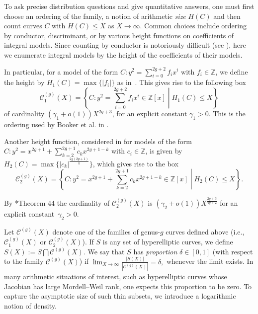 \documentclass{amsart}
\newcommand{\Z}{{\mathbb Z}}
\newcommand{\cC}{\mathcal{C}}
\begin{document}
 
 

 
 To ask precise distribution questions and give quantitative answers, one must first choose an ordering of the family, a notion of arithmetic \textit{size} $H(C)$ and then count curves $C$ with $H(C) \leq X$ as $X \to \infty $. Common choices include ordering by conductor, discriminant, or by various height functions on coefficients of integral models. Since counting by conductor is  notoriously difficult (see \cite{Brumer1992}), here we  enumerate integral models by the height of the coefficients of their models. 

 \medskip

 
In particular, for a model of the form $C: y^2=\sum_{i=0}^{2g+2}f_ix^i$ with $f_i \in \mathbb Z$, we define the height by $H_1(C) = \max\{|f_i|\}$ as in~\cite{BhargavaGross2017}.  This gives rise to the following box
 \begin{equation}\label{eq:cC1}
 \cC_1^{(g)}(X)=\left\{C: y^2=\sum_{i=0}^{2g+2}f_ix^i\in \Z[x] \middle| H_1(C) \leq  X \right\} \end{equation}
of cardinality  $(\gamma_1+o(1))  X^{2g+3}$, for an explicit constant $\gamma_1>0$. This is the ordering used by Booker et al. in \cite{Booker2016}.

\medskip


Another height function, considered in \cite{BhargavaGross2013} for models of the form $C: y^2=x^{2g+1}+\sum_{k=2}^{2g+1}c_kx^{2g+1-k}$ with $c_i \in \mathbb Z$, is given by $H_2(C) = \max\{|c_k|^{\frac{2g(2g+1)}{k}}\}$, which gives rise to the box
\begin{equation}\label{eq:cC2}
\cC_2^{(g)}(X)=\left\{C : y^2=x^{2g+1}+\sum_{k=2}^{2g+1}c_kx^{2g+1-k}\in \Z[x] \middle|  H_2(C) \leq X\right\} . \end{equation}

By \cite{BhargavaGross2013}*{Theorem 44} the cardinality of $\cC_2^{(g)}(X)$ is $(\gamma_2+o(1)) X^{\frac{2g+3}{4g+2}}$ for an explicit constant~$\gamma_2>0$. %




Let $\cC^{(g)}(X)$ denote one of the families of genus-$g$ curves defined above (i.e., $\cC_1^{(g)}(X)$ or $\cC_2^{(g)}(X)$).
If $S$ is any set of hyperelliptic curves, we define $S(X):=S\bigcap \cC^{(g)}(X)$. We say that $S$ has  \emph{proportion}  $\delta\in [0,1]$  (with respect to the family $\cC^{(g)}(X)$) if $\lim_{X\rightarrow\infty} \frac{|S(X)|}{|\cC^{(g)}(X)|}=\delta,$ whenever the limit exists. In many arithmetic situations of interest, such as hyperelliptic curves whose Jacobian has large Mordell--Weil rank, one expects this proportion to be zero. To capture the asymptotic size of such thin subsets, we introduce a logarithmic notion of density. 
\end{document}
